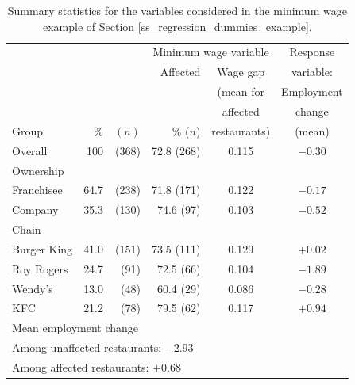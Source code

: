\begin{table}
\caption{Summary statistics for the variables considered in the minimum
wage example of Section \ref{ss_regression_dummies_example}.}
\label{t_fastfood_descr}
\begin{center}
\begin{tabular}{|l|rr||r|c|c|}\hline
& & & \multicolumn{2}{|c|}{Minimum wage variable} & Response \\ \cline{4-5}
& & & Affected & Wage gap & variable: \\
& & &  & (mean for & Employment \\
& & &  & affected & change \\
Group & \% & $(n)$ & \% ($n$)& restaurants)& (mean) \\ \hline
Overall & 100 & (368) & 72.8 (268) & 0.115 & $-0.30$ \\
Ownership & &  & & & \\
Franchisee & 64.7 & (238) & 71.8 (171) &  0.122 & $-0.17$\\
Company & 35.3 & (130) & 74.6 (97) &  0.103 &
$-0.52$\\
Chain & & & & & \\
Burger King & 41.0 & (151)& 73.5 (111) & 0.129 & $+0.02$ \\
Roy Rogers & 24.7 & (91) & 72.5 (66)& 0.104 &
$-1.89$ \\
Wendy's & 13.0 & (48)  & 60.4 (29)& 0.086 &
$-0.28$\\
KFC & 21.2 & (78) & 79.5 (62)& 0.117 &
$+0.94$\\
\hline \hline
\multicolumn{6}{|l|}{
Mean employment change}\\
\multicolumn{6}{|l|}{

Among unaffected restaurants: $-2.93$} \\
\multicolumn{6}{|l|}{

Among affected restaurants: $+0.68$} \\
\hline
\end{tabular}
\end{center}

\end{table}


